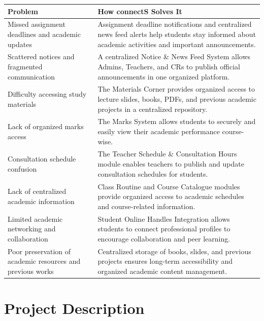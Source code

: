 \documentclass[12pt,a4paper]{article}
\newcommand{\THH}[1]{\small\bfseries\color{white} #1}
\begin{document}
\vspace{0.5em}
\begin{longtable}{|p{5.5cm}|p{8cm}|}
\hline
\rowcolor{navyblue}
\THH{Problem} & \THH{How \textbf{connectS} Solves It} \\
\hline
\endhead
Missed assignment deadlines and academic updates &
Assignment deadline notifications and centralized news feed alerts help students stay informed about academic activities and important announcements. \\
\hline
Scattered notices and fragmented communication &
A centralized Notice \& News Feed System allows Admins, Teachers, and CRs to publish official announcements in one organized platform. \\
\hline
Difficulty accessing study materials &
The Materials Corner provides organized access to lecture slides, books, PDFs, and previous academic projects in a centralized repository. \\
\hline
Lack of organized marks access &
The Marks System allows students to securely and easily view their academic performance course-wise. \\
\hline
Consultation schedule confusion &
The Teacher Schedule \& Consultation Hours module enables teachers to publish and update consultation schedules for students. \\
\hline
Lack of centralized academic information &
Class Routine and Course Catalogue modules provide organized access to academic schedules and course-related information. \\
\hline
Limited academic networking and collaboration &
Student Online Handles Integration allows students to connect professional profiles to encourage collaboration and peer learning. \\
\hline
Poor preservation of academic resources and previous works &
Centralized storage of books, slides, and previous projects ensures long-term accessibility and organized academic content management. \\
\hline
\end{longtable}
\newpage

\newpage
\section{Project Description}
\end{document}
